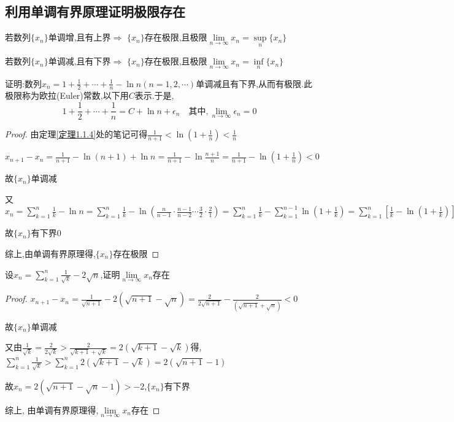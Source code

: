 \subsection{利用单调有界原理证明极限存在}

\begin{theorem}[单调有界原理]
    若数列$\{x_n\}$单调增,且有上界$\Longrightarrow$ $\{x_n\}$存在极限,且极限$\lim \limits_{n \to \infty} x_n = \underset{n}{\sup} \{x_n\}$

    若数列$\{x_n\}$单调减,且有下界$\Longrightarrow$ $\{x_n\}$存在极限,且极限$\lim \limits_{n \to \infty} x_n = \underset{n}{\inf} \{x_n\}$
\end{theorem}

\begin{example}
    证明:数列$x_n=1+\frac{1}{2}+\cdots+\frac{1}{n}-\ln n(n=1,2,\cdots)$单调减且有下界,从而有极限.此极限称为欧拉(Euler)常数,以下用$C$表示.于是,
    $$1+\frac{1}{2}+\cdots+\frac{1}{n} = C + \ln n +\epsilon_n \quad \mbox{其中}, \lim \limits_{n \to \infty} \epsilon_n = 0$$
\end{example}

\begin{proof}

    由定理\ref{定理1.1.4}处的笔记可得$\frac{1}{n+1}<\ln(1+\frac{1}{n})<\frac{1}{n}$

    $x_{n+1}-x_n=\frac{1}{n+1}-\ln (n+1)+\ln n
        =\frac{1}{n+1}-\ln \frac{n+1}{n}
        =\frac{1}{n+1}-\ln (1+\frac{1}{n})<0$

    故$\{x_n\}$单调减

    又$x_n=\sum\limits_{k=1}^{n} \frac{1}{k}-\ln n
        =\sum\limits_{k=1}^{n} \frac{1}{k}-\ln  (\frac{n}{n-1} \cdot \frac{n-1}{n-2} \cdots \frac{3}{2} \cdot \frac{2}{1})
        =\sum\limits_{k=1}^{n} \frac{1}{k}-\sum\limits_{k=1}^{n-1}\ln (1+\frac{1}{k})
        =\sum\limits_{k=1}^{n} [\frac{1}{k}-\ln (1+\frac{1}{k})]+\frac{1}{n}>\frac{1}{n}>0$

    故$\{x_n\}$有下界0

    综上,由单调有界原理得,$\{x_n\}$存在极限
\end{proof}

\begin{example}
    设$x_n=\sum\limits_{k=1}^{n} \frac{1}{\sqrt{k}}-2\sqrt{n}$,证明$\lim \limits_{n \to \infty} x_n$存在
\end{example}

\begin{proof}

    $x_{n+1}-x_n
        =\frac{1}{\sqrt{n+1}}-2(\sqrt{n+1}-\sqrt{n})
        =\frac{2}{2\sqrt{n+1}}-\frac{2}{(\sqrt{n+1}+\sqrt{n})}<0$

    故$\{x_n\}$单调减

    又由$\frac{1}{\sqrt{k}}=\frac{2}{2\sqrt{k}}>\frac{2}{\sqrt{k+1}+\sqrt{k}}=2(\sqrt{k+1}-\sqrt{k})$得,$\sum\limits_{k=1}^{n} \frac{1}{\sqrt{k}}>\sum\limits_{k=1}^{n} 2(\sqrt{k+1}-\sqrt{k})=2(\sqrt{n+1}-1)$

    故$x_n=2(\sqrt{n+1}-\sqrt{n}-1)>-2$,\quad$\{x_n\}$有下界

    综上, 由单调有界原理得,$\lim \limits_{n \to \infty} x_n$存在
\end{proof}

